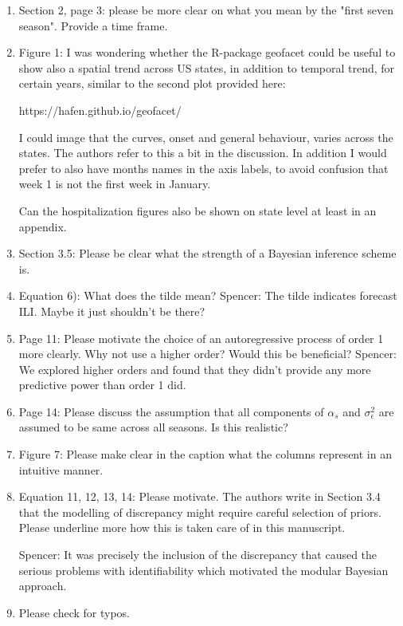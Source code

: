 \documentclass{article}
\newcommand{\spencer}[1]{{\color{blue} Spencer: #1}}
\begin{document}
\begin{enumerate}[-]

\item Section 2, page 3: please be more clear on what you mean by the 
"first seven season". Provide a time frame.

\item Figure 1: I was wondering whether the R-package geofacet could be useful to 
show also a spatial trend across US states, in addition to temporal trend, for 
certain years,  similar to the second plot provided here:

https://hafen.github.io/geofacet/

I could image that the curves, onset and general behaviour, varies across the 
states. The authors refer to this a bit in the discussion. In addition I would 
prefer to also have months names in the axis labels, to avoid confusion that 
week 1 is not the first week in January.

Can the hospitalization figures also be shown on state level at least in an appendix.

\item Section 3.5: Please be clear what the strength of a Bayesian inference scheme is. 

\item Equation 6): What does the tilde mean?
\spencer{The tilde indicates forecast ILI. Maybe it just shouldn't be there?}

\item Page 11: Please motivate the choice of an autoregressive process of order 1 
more clearly. Why not use a higher order? Would this be beneficial?
\spencer{We explored higher orders and found that they didn't provide any more
predictive power than order 1 did.}

\item Page 14: Please discuss the assumption that all components of $\alpha_s$ and 
$\sigma_\epsilon^2$ are assumed to be same across all seasons. Is this realistic?

\item Figure 7: Please make clear in the caption what the columns represent in an 
intuitive manner. 

\item Equation 11, 12, 13, 14: Please motivate. The authors write in Section 3.4 
that the modelling of discrepancy might require careful selection of priors. 
Please underline more how this is taken care of in this manuscript.

\spencer{It was precisely the inclusion of the discrepancy that caused the serious problems
with identifiability which motivated the modular Bayesian approach. }

\item Please check for typos.
  
\end{enumerate}
\end{document}
